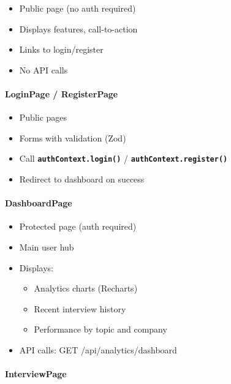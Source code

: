 \documentclass[12pt,a4paper,oneside]{article}
\newcommand{\funcname}[1]{\texttt{\textbf{#1}}}
\begin{document}
\begin{itemize}
    \item Public page (no auth required)
    \item Displays features, call-to-action
    \item Links to login/register
    \item No API calls
\end{itemize}

\paragraph{LoginPage / RegisterPage}

\begin{itemize}
    \item Public pages
    \item Forms with validation (Zod)
    \item Call \funcname{authContext.login()} / \funcname{authContext.register()}
    \item Redirect to dashboard on success
\end{itemize}

\paragraph{DashboardPage}

\begin{itemize}
    \item Protected page (auth required)
    \item Main user hub
    \item Displays:
    \begin{itemize}
        \item Analytics charts (Recharts)
        \item Recent interview history
        \item Performance by topic and company
    \end{itemize}
    \item API calls: GET /api/analytics/dashboard
\end{itemize}

\paragraph{InterviewPage}
\end{document}
